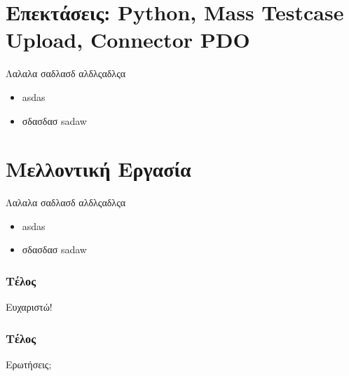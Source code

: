 \documentclass{beamer}
\begin{document}
\section{Επεκτάσεις: Python, Mass Testcase Upload, Connector PDO}
\begin{frame}
  Λαλαλα σαδλασδ αλδλςαδλςα
  \begin{itemize}
      \item asdas
      \item σδασδασ sadaw
  \end{itemize}
\end{frame}


\section{Μελλοντική Εργασία}
\begin{frame}
  Λαλαλα σαδλασδ αλδλςαδλςα
  \begin{itemize}
      \item asdas
      \item σδασδασ sadaw
  \end{itemize}
\end{frame}

\begin{frame}
  \frametitle{Τέλος}
  \centering
  Ευχαριστώ!
\end{frame}

\begin{frame}
  \frametitle{Τέλος}
  \centering
  Ερωτήσεις;
\end{frame}
\end{document}
